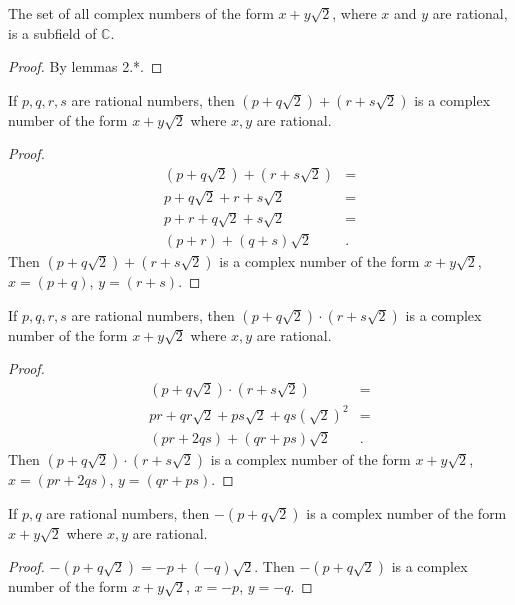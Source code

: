 \documentclass[12pt]{article}
\begin{document}
\begin{thm}
  The set of all complex numbers of the form $x + y\sqrt{2}$,
  where $x$ and $y$ are rational, is a subfield of $\mathbb{C}$.

  \begin{proof}
    By lemmas 2.*.
  \end{proof}
\end{thm}

\begin{lemma}
  If $p,q,r,s$ are rational numbers, then $(p + q\sqrt{2}) + (r
  + s\sqrt{2})$ is a complex number of the form $x +
  y\sqrt{2}$ where $x, y$ are rational.
  \begin{proof}
    \begin{align*}
      (p + q\sqrt{2}) + (r + s\sqrt{2}) &=\\
      p + q\sqrt{2} + r + s\sqrt{2} &=\\
      p + r + q\sqrt{2} + s\sqrt{2} &=\\
      (p + r) + (q + s)\sqrt{2}&.
    \end{align*}
    Then $(p + q\sqrt{2}) + (r + s\sqrt{2})$ is a complex number
    of the form $x + y\sqrt{2}$, $x = (p + q)$, $y = (r + s)$.
  \end{proof}
\end{lemma}

\begin{lemma}
  If $p,q,r,s$ are rational numbers, then $(p + q\sqrt{2})
  \cdot (r + s\sqrt{2})$ is a complex number of the form $x +
  y\sqrt{2}$ where $x, y$ are rational.
  \begin{proof}
    \begin{align*}
      (p + q\sqrt{2}) \cdot (r + s\sqrt{2}) &=\\
      pr + qr\sqrt{2} + ps\sqrt{2} + qs(\sqrt{2})^{2} &=\\
      (pr + 2qs) + (qr + ps)\sqrt{2}&.
    \end{align*}
    Then $(p + q\sqrt{2}) \cdot (r + s\sqrt{2})$ is a complex
    number of the form $x + y\sqrt{2}$, $x = (pr + 2qs)$, $y =
    (qr + ps)$.
  \end{proof}
\end{lemma}

\begin{lemma}
  If $p,q$ are rational numbers, then $-(p + q\sqrt{2})$ is a
  complex number of the form $x + y\sqrt{2}$ where $x, y$ are
  rational.
  \begin{proof}
    $-(p + q\sqrt{2}) = -p + (-q)\sqrt{2}$. Then $-(p +
    q\sqrt{2})$ is a complex number of the form $x + y\sqrt{2}$,
    $x = -p$, $y = -q$.
  \end{proof}
\end{lemma}
\end{document}

